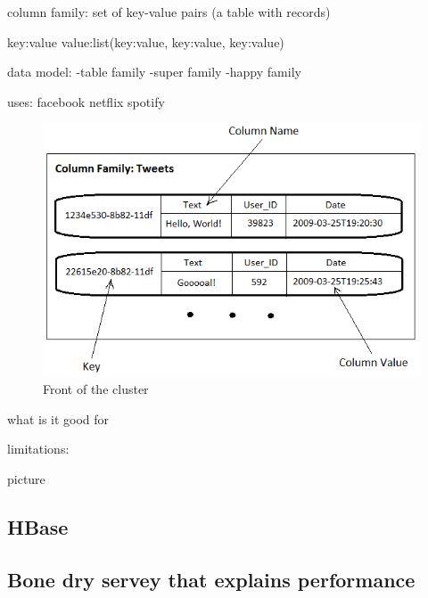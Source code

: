 column family: set of key-value pairs (a table with records)

key:value
value:list(key:value, key:value, key:value)


data model:
	-table family
	-super family
	-happy family

uses:
	facebook
	netflix
	spotify


\begin{figure}[ht]

\quad
\begin{minipage}[b]{0.45\linewidth}
    \includegraphics[width=1\textwidth]{resources/twitterschema-tweets.png}
    \caption{Front of the cluster}
    \label{fig:minipage2}
\end{minipage}
\end{figure}

what is it good for



limitations:
	
picture



\subsection{HBase}

\subsection{Bone dry servey that explains performance}
